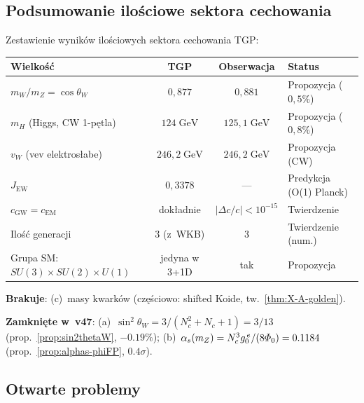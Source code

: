 \subsection{Podsumowanie ilo\'sciowe sektora cechowania}%
\label{ssec:gauge-summary}

\begin{remark}%
\label{rem:gauge-quantitative}
Zestawienie wynik\'ow ilo\'sciowych sektora cechowania TGP:
\begin{center}\small
\begin{tabular}{@{}lccl@{}}
\toprule
\textbf{Wielko\'s\'c} & \textbf{TGP} & \textbf{Obserwacja}
  & \textbf{Status} \\
\midrule
$m_W / m_Z = \cos\theta_W$
  & $0{,}877$ & $0{,}881$ & Propozycja ($0{,}5\%$) \\
$m_H$ (Higgs, CW 1-p\k{e}tla)
  & $124\;\mathrm{GeV}$ & $125{,}1\;\mathrm{GeV}$ & Propozycja ($0{,}8\%$) \\
$v_W$ (vev elektros\l{}abe)
  & $246{,}2\;\mathrm{GeV}$ & $246{,}2\;\mathrm{GeV}$ & Propozycja (CW) \\
$J_{\mathrm{EW}}$
  & $0{,}3378$ & --- & Predykcja (O(1) Planck) \\
$c_{\mathrm{GW}} = c_{\mathrm{EM}}$
  & dok\l{}adnie & $|\Delta c/c| < 10^{-15}$ & Twierdzenie \\
Ilo\'s\'c generacji
  & $3$ (z~WKB) & $3$ & Twierdzenie (num.) \\
Grupa SM: $SU(3){\times}SU(2){\times}U(1)$
  & jedyna w 3+1D & tak & Propozycja \\
\bottomrule
\end{tabular}
\end{center}
\noindent
\textbf{Brakuje}:
(c)~masy kwark\'ow (cz\k{e}\'sciowo: shifted Koide,
tw.~\ref{thm:X-A-golden}).

\smallskip\noindent
\textbf{Zamkni\k{e}te w~v47}:
(a)~$\sin^2\theta_W = 3/(N_c^2{+}N_c{+}1) = 3/13$
(prop.~\ref{prop:sin2thetaW}, $-0.19\%$);
(b)~$\alpha_s(m_Z) = N_c^3 g_0^{\,e}/(8\varPhi_0) = 0.1184$
(prop.~\ref{prop:alphas-phiFP}, $0.4\sigma$).
\end{remark}

\subsection{Otwarte problemy}\label{ssec:cechowanie-problemy}

